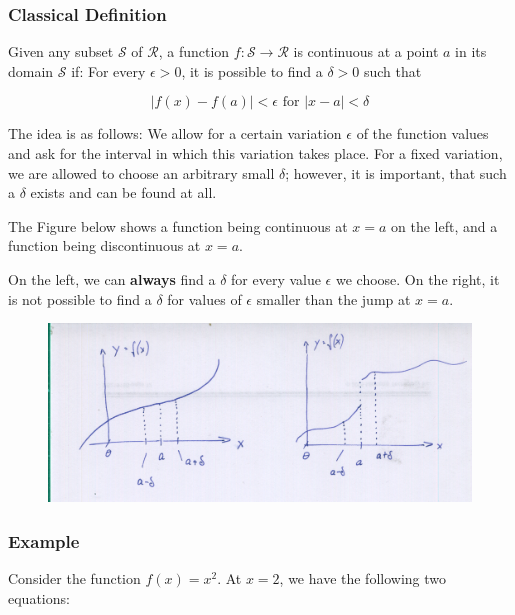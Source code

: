 
\subsubsection{Classical Definition}

Given any subset \(\mathcal{S}\) of \(\mathcal{R}\), a function
\(f : \mathcal{S} \rightarrow \mathcal{R}\) is continuous at a point
\(a\) in its domain \(\mathcal{S}\) if: For every \(\epsilon > 0\), it
is possible to find a \(\delta > 0\) such that

\[
| f(x) - f(a) | < \epsilon \,\, \text{for} \,\, |x-a| < \delta
\]

The idea is as follows: We allow for a certain variation \(\epsilon\) of
the function values and ask for the interval in which this variation
takes place. For a fixed variation, we are allowed to choose an
arbitrary small \(\delta\); however, it is important, that such a
\(\delta\) exists and can be found at all.

The Figure below shows a function being continuous at \(x=a\) on the
left, and a function being discontinuous at \(x=a\).

On the left, we can \textbf{always} find a \(\delta\) for every value
\(\epsilon\) we choose. On the right, it is not possible to find a
\(\delta\) for values of \(\epsilon\) smaller than the jump at \(x=a\).

\begin{figure}[H]
\includegraphics[scale=0.7]{images/continuity_01.png}
\end{figure}

\subsubsection{Example}

Consider the function \(f(x)=x^2\). At \(x=2\), we have the following
two equations:


